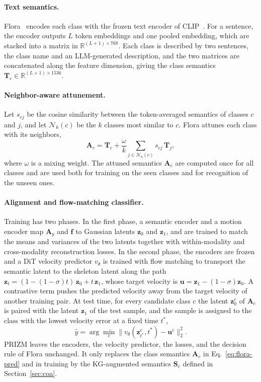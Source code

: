\documentclass[11pt]{article}
\begin{document}
\paragraph{Text semantics.}
Flora~\cite{flora26} encodes each class with the frozen text encoder of CLIP~\cite{clip21}. For a sentence, the encoder outputs $L$ token embeddings and one pooled embedding, which are stacked into a matrix in $\mathbb{R}^{(L+1) \times 768}$. Each class is described by two sentences, the class name and an LLM-generated description, and the two matrices are concatenated along the feature dimension, giving the class semantics $\mathbf{T}_c \in \mathbb{R}^{(L+1) \times 1536}$.

\paragraph{Neighbor-aware attunement.}
Let $s_{cj}$ be the cosine similarity between the token-averaged semantics of classes $c$ and $j$, and let $\mathcal{N}_k(c)$ be the $k$ classes most similar to $c$. Flora attunes each class with its neighbors,
\begin{equation}
  \mathbf{A}_c = \mathbf{T}_c + \frac{\omega}{k} \sum_{j \in \mathcal{N}_k(c)} s_{cj}\, \mathbf{T}_j ,
  \label{eq:attune}
\end{equation}
where $\omega$ is a mixing weight. The attuned semantics $\mathbf{A}_c$ are computed once for all classes and are used both for training on the seen classes and for recognition of the unseen ones.

\paragraph{Alignment and flow-matching classifier.}
Training has two phases. In the first phase, a semantic encoder and a motion encoder map $\mathbf{A}_{y}$ and $\mathbf{f}$ to Gaussian latents $\mathbf{z}_0$ and $\mathbf{z}_1$, and are trained to match the means and variances of the two latents together with within-modality and cross-modality reconstruction losses. In the second phase, the encoders are frozen and a DiT velocity predictor $v_\theta$ is trained with flow matching to transport the semantic latent to the skeleton latent along the path $\mathbf{z}_t = (1 - (1-\sigma)t)\,\mathbf{z}_0 + t\,\mathbf{z}_1$, whose target velocity is $\mathbf{u} = \mathbf{z}_1 - (1-\sigma)\mathbf{z}_0$. A contrastive term pushes the predicted velocity away from the target velocity of another training pair. At test time, for every candidate class $c$ the latent $\mathbf{z}_0^{c}$ of $\mathbf{A}_c$ is paired with the latent $\mathbf{z}_1$ of the test sample, and the sample is assigned to the class with the lowest velocity error at a fixed time $t^\ast$,
\begin{equation}
  \hat{y} = \arg\min_{c} \big\| v_\theta(\mathbf{z}^{c}_{t^\ast}, t^\ast) - \mathbf{u}^{c} \big\|_2^2 .
  \label{eq:flora-pred}
\end{equation}
PRIZM leaves the encoders, the velocity predictor, the losses, and the decision rule of Flora unchanged. It only replaces the class semantics $\mathbf{A}_c$ in Eq.~\eqref{eq:flora-pred} and in training by the KG-augmented semantics $\mathbf{S}_c$ defined in Section~\ref{sec:coa}.
\end{document}

